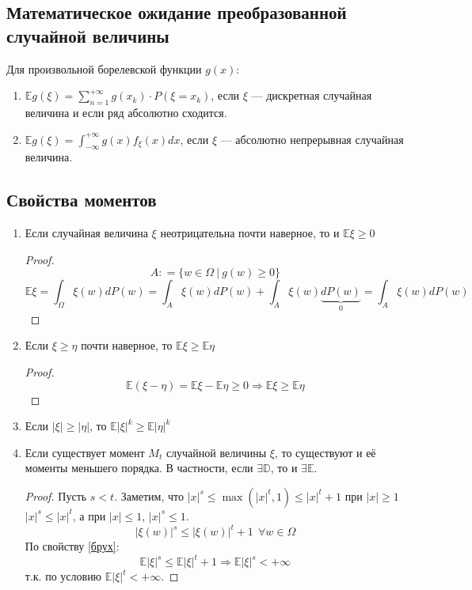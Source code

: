 \subsection{Математическое ожидание преобразованной случайной величины}

\begin{theorem}
    Для произвольной борелевской функции \(g(x)\):
    \begin{enumerate}
        \item \(\mathbb{E} g(\xi) = \sum_{n = 1}^{+\infty} g(x_k) \cdot P(\xi = x_k)\), если \(\xi\) --- дискретная случайная величина и если ряд абсолютно сходится.
        \item \(\mathbb{E} g(\xi) = \int_{ -\infty}^{+\infty} g(x) f_\xi(x) dx\), если \(\xi\) --- абсолютно непрерывная случайная величина.
    \end{enumerate}
\end{theorem}

\subsection{Свойства моментов}

\begin{enumerate}
    \item Если случайная величина \(\xi\) неотрицательна почти наверное, то и \(\mathbb{E}\xi \geq 0\)
          \begin{proof}
              \[A : = \{w \in \Omega\ |\ g(w) \geq 0\}\]
              \[\mathbb{E}\xi = \int_\Omega \xi(w) d P(w) = \int_A \xi(w) d P(w) + \int_{\overline A} \xi(w) \underbrace{d P(w)}_{0} = \int_A \xi(w) d P(w)\]
          \end{proof}
    \item Если \(\xi \geq \eta\) почти наверное, то \(\mathbb{E}\xi \geq \mathbb{E}\eta\) \label{брух}
          \begin{proof}
              \[\mathbb{E}(\xi - \eta) = \mathbb{E}\xi - \mathbb{E}\eta \geq 0 \Rightarrow \mathbb{E}\xi \geq \mathbb{E}\eta\]
          \end{proof}

    \item Если \(|\xi| \geq |\eta|\), то \(\mathbb{E}|\xi|^k \geq \mathbb{E}|\eta|^k\)
    \item Если существует момент \(M_t\) случайной величины \(\xi\), то существуют и её моменты меньшего порядка. В частности, если \(\exists \mathbb{D}\), то и \(\exists \mathbb{E}\).
          \begin{proof}
              Пусть \(s < t\). Заметим, что \(|x|^s \leq \max(|x|^t, 1) \leq |x|^t + 1\) при \(|x| \geq 1\) \(|x|^s \leq |x|^t\), а при \(|x| \leq 1\), \(|x|^s \leq 1\).
              \[|\xi(w)|^s \leq |\xi(w)|^t + 1 \ \ \forall w \in \Omega\]
              По свойству \ref{брух}:
              \[\mathbb{E}|\xi|^s \leq \mathbb{E}|\xi|^t + 1 \Rightarrow \mathbb{E}|\xi|^s < +\infty\]
              т.к. по условию \(\mathbb{E}|\xi|^t < +\infty\).
          \end{proof}
\end{enumerate}

